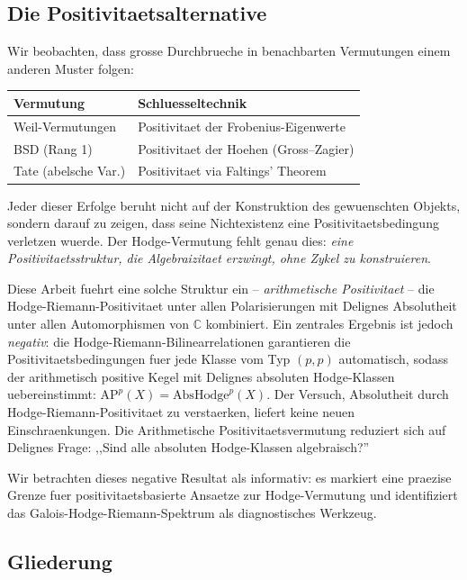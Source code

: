 \documentclass[aps,prd,twocolumn,superscriptaddress,nofootinbib]{revtex4-2}
\theoremstyle{definition}
\theoremstyle{remark}
\begin{document}
\subsection{Die Positivitaetsalternative}

Wir beobachten, dass grosse Durchbrueche in benachbarten Vermutungen einem anderen Muster folgen:

\begin{center}
\begin{tabular}{ll}
\hline
Vermutung & Schluesseltechnik \\
\hline
Weil-Vermutungen & Positivitaet der Frobenius-Eigenwerte \\
BSD (Rang 1) & Positivitaet der Hoehen (Gross--Zagier) \\
Tate (abelsche Var.) & Positivitaet via Faltings' Theorem \\
\hline
\end{tabular}
\end{center}

Jeder dieser Erfolge beruht nicht auf der Konstruktion des gewuenschten Objekts, sondern darauf zu zeigen, dass seine Nichtexistenz eine Positivitaetsbedingung verletzen wuerde. Der Hodge-Vermutung fehlt genau dies: \textit{eine Positivitaetsstruktur, die Algebraizitaet erzwingt, ohne Zykel zu konstruieren}.

Diese Arbeit fuehrt eine solche Struktur ein -- \textit{arithmetische Positivitaet} -- die Hodge-Riemann-Positivitaet unter allen Polarisierungen mit Delignes Absolutheit unter allen Automorphismen von $\mathbb{C}$ kombiniert. Ein zentrales Ergebnis ist jedoch \textit{negativ}: die Hodge-Riemann-Bilinearrelationen garantieren die Positivitaetsbedingungen fuer jede Klasse vom Typ $(p,p)$ automatisch, sodass der arithmetisch positive Kegel mit Delignes absoluten Hodge-Klassen uebereinstimmt: $\mathrm{AP}^p(X) = \mathrm{AbsHodge}^p(X)$. Der Versuch, Absolutheit durch Hodge-Riemann-Positivitaet zu verstaerken, liefert keine neuen Einschraenkungen. Die Arithmetische Positivitaetsvermutung reduziert sich auf Delignes Frage: ,,Sind alle absoluten Hodge-Klassen algebraisch?''

Wir betrachten dieses negative Resultat als informativ: es markiert eine praezise Grenze fuer positivitaetsbasierte Ansaetze zur Hodge-Vermutung und identifiziert das Galois-Hodge-Riemann-Spektrum als diagnostisches Werkzeug.

\subsection{Gliederung}
\end{document}
